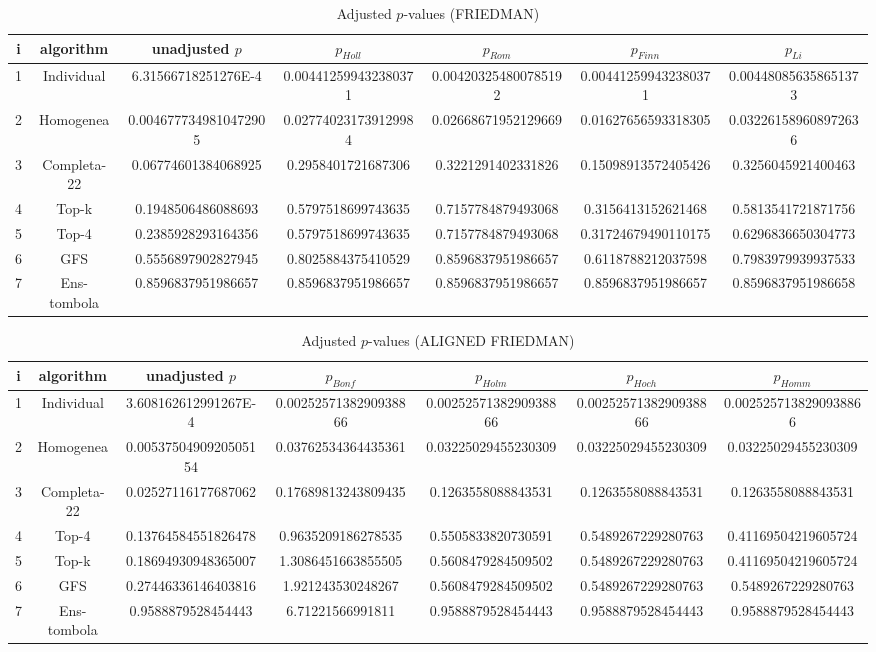 \documentclass[a4paper,10pt]{article}
\begin{document}
\begin{landscape}
\begin{table}[!htp]
\centering\scriptsize
\caption{Adjusted $p$-values (FRIEDMAN)}
\begin{tabular}{ccccccc}
i&algorithm&unadjusted $p$&$p_{Holl}$&$p_{Rom}$&$p_{Finn}$&$p_{Li}$\\
\hline
1&Individual&6.31566718251276E-4&0.004412599432380371&0.004203254800785192&0.004412599432380371&0.004480856358651373\\
2&Homogenea&0.0046777349810472905&0.027740231739129984&0.02668671952129669&0.01627656593318305&0.032261589608972636\\
3&Completa-22&0.06774601384068925&0.2958401721687306&0.3221291402331826&0.15098913572405426&0.3256045921400463\\
4&Top-k&0.1948506486088693&0.5797518699743635&0.7157784879493068&0.3156413152621468&0.5813541721871756\\
5&Top-4&0.2385928293164356&0.5797518699743635&0.7157784879493068&0.31724679490110175&0.6296836650304773\\
6&GFS&0.5556897902827945&0.8025884375410529&0.8596837951986657&0.6118788212037598&0.7983979939937533\\
7&Ens-tombola&0.8596837951986657&0.8596837951986657&0.8596837951986657&0.8596837951986657&0.8596837951986658\\
\hline
\end{tabular}
\end{table}


\newpage

\begin{table}[!htp]
\centering\scriptsize
\caption{Adjusted $p$-values (ALIGNED FRIEDMAN)}
\begin{tabular}{ccccccc}
i&algorithm&unadjusted $p$&$p_{Bonf}$&$p_{Holm}$&$p_{Hoch}$&$p_{Homm}$\\
\hline
1&Individual&3.608162612991267E-4&0.0025257138290938866&0.0025257138290938866&0.0025257138290938866&0.0025257138290938866\\
2&Homogenea&0.0053750490920505154&0.03762534364435361&0.03225029455230309&0.03225029455230309&0.03225029455230309\\
3&Completa-22&0.02527116177687062&0.17689813243809435&0.1263558088843531&0.1263558088843531&0.1263558088843531\\
4&Top-4&0.13764584551826478&0.9635209186278535&0.5505833820730591&0.5489267229280763&0.41169504219605724\\
5&Top-k&0.18694930948365007&1.3086451663855505&0.5608479284509502&0.5489267229280763&0.41169504219605724\\
6&GFS&0.27446336146403816&1.921243530248267&0.5608479284509502&0.5489267229280763&0.5489267229280763\\
7&Ens-tombola&0.9588879528454443&6.71221566991811&0.9588879528454443&0.9588879528454443&0.9588879528454443\\
\hline
\end{tabular}
\end{table}


\end{landscape}
\end{document}
